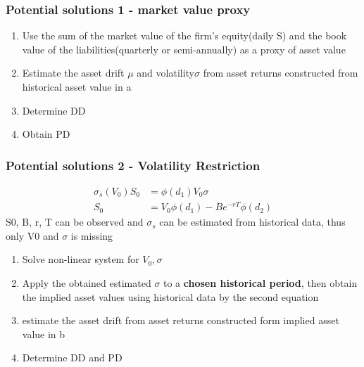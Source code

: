 \documentclass{article}
\theoremstyle{definition}
\theoremstyle{thrm}
\theoremstyle{lma}
\theoremstyle{ppst}
\theoremstyle{crlr}
\begin{document}
\subsubsection{Potential solutions 1 - market value proxy}
\begin{enumerate}
	\item Use the sum of the market value of the firm's equity(daily S) and the book value of the liabilities(quarterly or semi-annually) as a proxy of asset value
	\item Estimate the asset drift $\mu$ and volatility$\sigma$ from asset returns constructed from historical asset value in a
	\item Determine DD 
	\item Obtain PD
\end{enumerate}
\subsubsection{Potential solutions 2 - Volatility Restriction}
\begin{align*}
	\sigma_s(V_0)S_0 &= \phi(d_1)V_0\sigma\\
	S_0 &= V_0\phi(d_1)-Be^{-rT}\phi(d_2)
\end{align*}
S0, B, r, T can be observed and $\sigma_s$ can be estimated from historical data, thus only V0 and $\sigma$ is missing
\begin{enumerate}
	\item Solve non-linear system for $V_0, \sigma$
	\item Apply the obtained estimated $\sigma $ to a \textbf{chosen historical period}, then obtain the implied asset values using historical data by the second equation
	\item estimate the asset drift from asset returns constructed form implied asset value in b
	\item Determine DD and PD
\end{enumerate}
\end{document}
